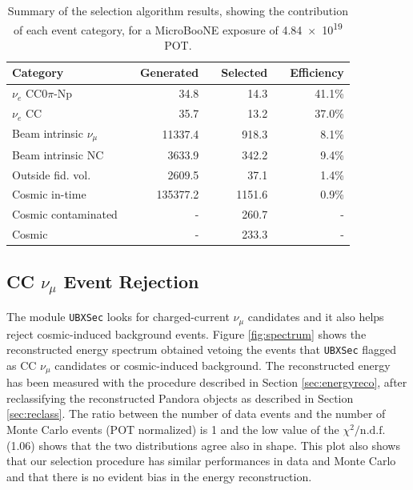 \begin{table}[htbp]
   \centering
   \begin{tabular}{llrrrrr}
     \toprule
     Category & \phantom{a} & Generated & \phantom{a} & Selected & \phantom{a} & Efficiency \\
     \midrule

     $\nu_{e}$ CC0$\pi$-Np       & & 34.8     & & 14.3   & & 41.1\%\\
     $\nu_{e}$ CC                & & 35.7     & & 13.2   & & 37.0\%\\
     Beam intrinsic $\nu_{\mu}$  & & 11337.4  & & 918.3  & & 8.1\%\\
     Beam intrinsic NC           & & 3633.9   & & 342.2  & & 9.4\%\\
     Outside fid. vol.           & & 2609.5   & & 37.1   & & 1.4\%\\
     Cosmic in-time              & & 135377.2 & & 1151.6 & & 0.9\%\\
     Cosmic contaminated         & & -        & & 260.7  & & -\\
     Cosmic                      & & -        & & 233.3  & & -\\

     \bottomrule
   \end{tabular}
   \caption{Summary of the selection algorithm results, showing the contribution of each event category, for a MicroBooNE exposure of \num{4.84e19} POT.}\label{tab:result}
\end{table}


\subsection{CC \texorpdfstring{$\nu_{\mu}$}{numu} Event Rejection}\label{sec:numu}
The module \texttt{UBXSec} \cite{ubxsec} looks for charged-current $\nu_{\mu}$ candidates and it also helps reject cosmic-induced background events.  Figure \ref{fig:spectrum} shows the reconstructed energy spectrum obtained vetoing the events that \texttt{UBXSec} flagged as CC $\nu_{\mu}$ candidates or cosmic-induced background. The reconstructed energy has been measured with the procedure described in Section \ref{sec:energyreco}, after reclassifying the reconstructed Pandora objects as described in Section \ref{sec:reclass}. The ratio between the number of data events and the number of Monte Carlo events (POT normalized) is 1 and the low value of the $\chi^{2} / \mathrm{n.d.f.}$ (1.06) shows that the two distributions agree also in shape. This plot also shows that our selection procedure has similar performances in data and Monte Carlo and that there is no evident bias in the energy reconstruction. 

